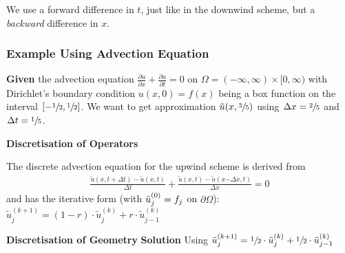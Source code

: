 We use a forward difference in $t$, just like in the downwind scheme,
but a \emph{backward} difference in $x$.

\subsubsection{Example Using Advection Equation}
\textbf{Given} the advection equation 
$\frac{\partial u}{\partial x} + \frac{\partial u}{\partial t} = 0$ on
$\Omega = (-\infty,\infty)\times[0,\infty)$ with Dirichlet's boundary condition
$u(x,0) = f(x)$ being a box function on the interval $[-\sfrac{1}{2},\sfrac{1}{2}]$.
We want to get approximation $\tilde{u}(x,\sfrac{3}{5})$ using
$\Delta x = \sfrac{2}{5}$ and $\Delta t = \sfrac{1}{5}$.

\textbf{Discretisation of Operators}

The discrete advection equation for the upwind scheme is derived from
\begin{align*}
	\frac{\tilde{u}(x,t+\Delta t)-\tilde{u}(x,t)}{\Delta t}+\frac{\tilde{u}(x,t)-\tilde{u}(x\mathbf{-}\Delta x,t)}{\Delta x}=0
\end{align*}
and has the iterative form (with $\tilde{u}_j^{(0)}=f_j$ on $\partial\Omega$):
\colorbox{shadecolor}{$
	\displaystyle\tilde{u}_{j}^{(k+1)}=(1-r)\cdot\tilde{u}_{j}^{(k)}+r\cdot\tilde{u}_{j-1}^{(k)}
$}

\textbf{Discretisation of Geometry}
\textbf{Solution}
Using $\tilde{u}_j^{(k+1)} = \sfrac{1}{2}\cdot\tilde{u}_j^{(k)} + \sfrac{1}{2}\cdot\tilde{u}_{j-1}^{(k)}$